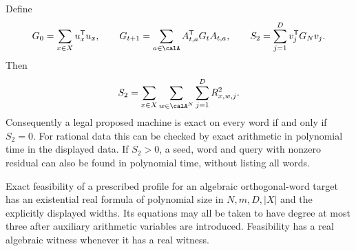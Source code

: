 \begin{theorem}\label{thm:gram46}
Define
\begin{equation}\label{eq:gram46}
 G_0=\sum_{x\in X}u_x^{\mathsf T}u_x,\qquad
 G_{t+1}=\sum_{a\in\calA}A_{t,a}^{\mathsf T}G_tA_{t,a},\qquad
 S_2=\sum_{j=1}^D v_j^{\mathsf T}G_Nv_j.
\end{equation}
Then
\[
 S_2=\sum_{x\in X}\sum_{w\in\calA^N}\sum_{j=1}^D R_{x,w,j}^2.
\]
Consequently a legal proposed machine is exact on every word if and
only if $S_2=0$. For rational data this can be checked by exact
arithmetic in polynomial time in the displayed data. If $S_2>0$, a
seed, word and query with nonzero residual can also be found in
polynomial time, without listing all words.

Exact feasibility of a prescribed profile for an algebraic
orthogonal-word target has an existential real formula of polynomial
size in $N,m,D,|X|$ and the explicitly displayed widths. Its equations
may all be taken to have degree at most three after auxiliary arithmetic
variables are introduced. Feasibility has a real algebraic witness
whenever it has a real witness.
\end{theorem}
